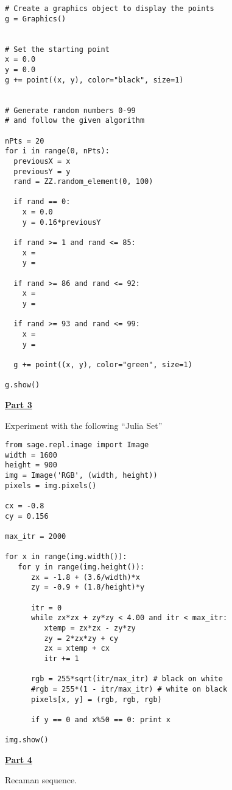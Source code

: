 \begin{verbatim}
# Create a graphics object to display the points
g = Graphics()


# Set the starting point
x = 0.0 
y = 0.0 
g += point((x, y), color="black", size=1)


# Generate random numbers 0-99
# and follow the given algorithm

nPts = 20
for i in range(0, nPts):
  previousX = x 
  previousY = y 
  rand = ZZ.random_element(0, 100)

  if rand == 0:
    x = 0.0 
    y = 0.16*previousY

  if rand >= 1 and rand <= 85: 
    x =
    y =

  if rand >= 86 and rand <= 92: 
    x =
    y =

  if rand >= 93 and rand <= 99: 
    x =
    y =

  g += point((x, y), color="green", size=1)

g.show()
\end{verbatim}


\underline{\textbf{Part 3}} \par

Experiment with the following ``Julia Set''

\begin{verbatim}
from sage.repl.image import Image
width = 1600
height = 900 
img = Image('RGB', (width, height))
pixels = img.pixels()

cx = -0.8
cy = 0.156

max_itr = 2000

for x in range(img.width()):
   for y in range(img.height()):
      zx = -1.8 + (3.6/width)*x
      zy = -0.9 + (1.8/height)*y
            
      itr = 0 
      while zx*zx + zy*zy < 4.00 and itr < max_itr:
         xtemp = zx*zx - zy*zy
         zy = 2*zx*zy + cy
         zx = xtemp + cx
         itr += 1

      rgb = 255*sqrt(itr/max_itr) # black on white
      #rgb = 255*(1 - itr/max_itr) # white on black
      pixels[x, y] = (rgb, rgb, rgb)

      if y == 0 and x%50 == 0: print x

img.show()
\end{verbatim}

\underline{\textbf{Part 4}} \par

Recaman sequence.

\pagebreak \clearpage
